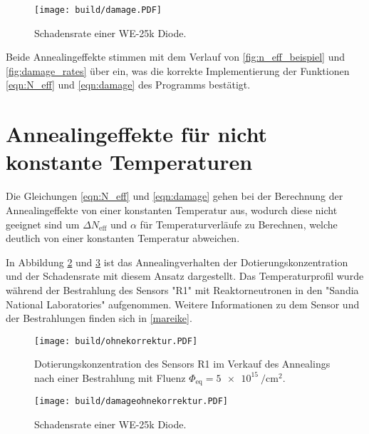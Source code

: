 \begin{figure}
    \texttt{[image: build/damage.PDF]}
    \caption{Schadensrate einer WE-25k Diode.}
    \label{fig:damage}
\end{figure}

Beide Annealingeffekte stimmen mit dem Verlauf von \ref{fig:n_eff_beispiel} und \ref{fig:damage_rates} über ein, was
die korrekte Implementierung der Funktionen \ref{eqn:N_eff} und \ref{eqn:damage}  des Programms
bestätigt.



\section{Annealingeffekte für nicht konstante Temperaturen}{\label{nicht_konstant}}
Die Gleichungen \ref{eqn:N_eff} und \ref{eqn:damage} gehen bei der Berechnung der Annealingeffekte von
einer konstanten Temperatur aus, wodurch diese nicht geeignet sind um $\Delta N_{\mathrm{eff}}$ und $\alpha$ für
Temperaturverläufe zu Berechnen, welche deutlich von einer konstanten Temperatur abweichen.


In Abbildung \ref{fig:N_eff_ohne} und \ref{fig:damage_ohne} ist das Annealingverhalten
der Dotierungskonzentration und der Schadensrate mit
diesem Ansatz dargestellt.
Das Temperaturprofil wurde während der Bestrahlung
des Sensors "R1" mit Reaktorneutronen in den
"Sandia National Laboratories" aufgenommen. Weitere Informationen zu dem Sensor und
der Bestrahlungen finden sich in \ref{mareike}.

\begin{figure}
    \texttt{[image: build/ohnekorrektur.PDF]}
    \caption{Dotierungskonzentration des Sensors R1 im Verkauf des Annealings nach einer Bestrahlung mit Fluenz $\Phi_{\mathrm{eq}} = \SI{5e15}{\per\centi\meter\squared}.$}
    \label{fig:N_eff_ohne}
\end{figure}

\begin{figure}
    \texttt{[image: build/damageohnekorrektur.PDF]}
    \caption{Schadensrate einer WE-25k Diode.}
    \label{fig:damage_ohne}
\end{figure}

